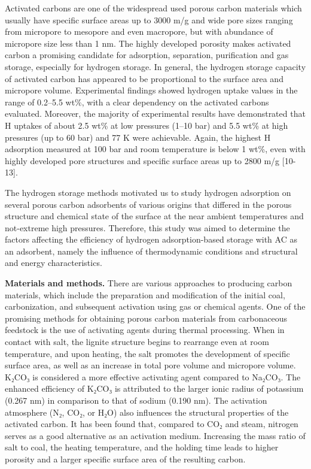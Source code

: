 \begin{multicols}{2}
Activated carbons are one of the widespread used porous carbon materials
which usually have specific surface areas up to 3000
m/g and wide pore sizes ranging
from micropore to mesopore and even macropore, but with abundance of
micropore size less than 1 nm. The highly developed porosity makes
activated carbon a promising candidate for adsorption, separation,
purification and gas storage, especially for hydrogen storage. In
general, the hydrogen storage capacity of activated carbon has appeared
to be proportional to the surface area and micropore volume.
Experimental findings showed hydrogen uptake values in the range of
0.2--5.5 wt\%, with a clear dependency on the activated carbons
evaluated. Moreover, the majority of experimental results have
demonstrated that H uptakes of about 2.5 wt\% at low
pressures (1--10 bar) and 5.5 wt\% at high pressures (up to 60 bar) and
77 K were achievable. Again, the highest H adsorption
measured at 100 bar and room temperature is below 1 wt\%, even with
highly developed pore structures and specific surface areas up to 2800
m/g {[}10-13{]}.

The hydrogen storage methods motivated us to study hydrogen adsorption
on several porous carbon adsorbents of various origins that differed in
the porous structure and chemical state of the surface at the near
ambient temperatures and not-extreme high pressures. Therefore, this
study was aimed to determine the factors affecting the efficiency of
hydrogen adsorption-based storage with AC as an adsorbent, namely the
influence of thermodynamic conditions and structural and energy
characteristics.

{\bfseries Materials and methods.} There are various approaches to
producing carbon materials, which include the preparation and
modification of the initial coal, carbonization, and subsequent
activation using gas or chemical agents. One of the promising methods
for obtaining porous carbon materials from carbonaceous feedstock is the
use of activating agents during thermal processing. When in contact with
salt, the lignite structure begins to rearrange even at room
temperature, and upon heating, the salt promotes the development of
specific surface area, as well as an increase in total pore volume and
micropore volume. K₂CO₃ is considered a more effective activating agent
compared to Na₂CO₃. The enhanced efficiency of K₂CO₃ is attributed to
the larger ionic radius of potassium (0.267 nm) in comparison to that of
sodium (0.190 nm). The activation atmosphere (N₂, CO₂, or H₂O) also
influences the structural properties of the activated carbon. It has
been found that, compared to CO₂ and steam, nitrogen serves as a good
alternative as an activation medium. Increasing the mass ratio of salt
to coal, the heating temperature, and the holding time leads to higher
porosity and a larger specific surface area of the resulting carbon.


\end{multicols}
